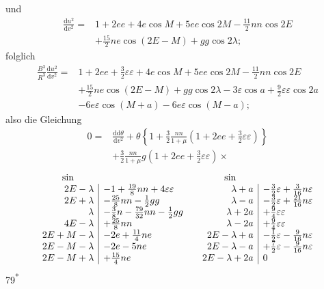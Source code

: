 \noindent und
\[
\begin{aligned}
\frac{\mathrm{d}u^2}{\mathrm{d}v^2}={}&1+2ee+4e\cos M+5ee\cos2M
-\tfrac{11}{2}nn\cos2E\\
&+\tfrac{15}{2}ne\cos(2E-M)+gg\cos2\lambda;
\end{aligned}
\]
\noindent folglich
\[
\begin{aligned}
\frac{B^3}{R^3}\frac{\mathrm{d}u^2}{\mathrm{d}v^2}
={}&1+2ee+\tfrac32\varepsilon\varepsilon+4e\cos M+5ee\cos2M
-\tfrac{11}{2}nn\cos2E\\
&+\tfrac{15}{2}ne\cos(2E-M)+gg\cos2\lambda
-3\varepsilon\cos a+\tfrac92\varepsilon\varepsilon\cos2a\\
&-6e\varepsilon\cos(M+a)-6e\varepsilon\cos(M-a);
\end{aligned}
\]
\noindent also die Gleichung
\[
\begin{aligned}
0={}&\frac{\mathrm{dd}\theta}{\mathrm{d}v^2}
+\theta\left\{1+\frac32\frac{nn}{1+\mu}(1+2ee+\tfrac32\varepsilon\varepsilon)\right\}\\
&+\frac32\frac{nn}{1+\mu}g(1+2ee+\tfrac32\varepsilon\varepsilon)\times
\end{aligned}
\]
\begingroup\small
\setlength{\arraycolsep}{3pt}\renewcommand{\arraystretch}{1.5}
\[
\begin{array}{r|l@{\qquad}r|l}
\multicolumn{1}{c}{\sin}& &\multicolumn{1}{c}{\sin}&\\
2E-\lambda&-1+\tfrac{19}{8}nn+4\varepsilon\varepsilon
 &\lambda+a&-\tfrac32\varepsilon+\tfrac{3}{16}n\varepsilon\\
2E+\lambda&-\tfrac{25}{8}nn-\tfrac12gg
 &\lambda-a&-\tfrac32\varepsilon+\tfrac{21}{16}n\varepsilon\\
\lambda&-\tfrac38n-\tfrac{79}{32}nn-\tfrac12gg
 &\lambda+2a&+\tfrac94\varepsilon\varepsilon\\
4E-\lambda&+\tfrac{25}{8}nn
 &\lambda-2a&+\tfrac94\varepsilon\varepsilon\\
2E+M-\lambda&-2e+\tfrac{11}{4}ne
 &2E-\lambda+a&-\tfrac12\varepsilon-\tfrac{9}{16}n\varepsilon\\
2E-M-\lambda&-2e-5ne
 &2E-\lambda-a&+\tfrac72\varepsilon-\tfrac{9}{16}n\varepsilon\\
2E-M+\lambda&+\tfrac{15}{4}ne
 &2E-\lambda+2a&0
\end{array}
\]
\endgroup
\noindent\hfill79\textsuperscript{*}\par
{}
\begingroup\small
\setlength{\arraycolsep}{3pt}\renewcommand{\arraystretch}{1.5}
